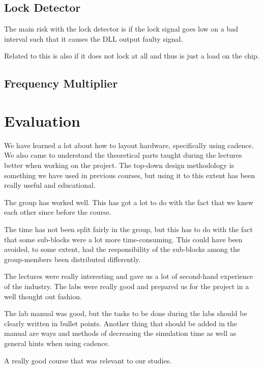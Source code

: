 \documentclass[a4paper,12pt]{article} \usepackage{graphicx}
\begin{document}
\subsection{Lock Detector}
The main risk with the lock detector is if the lock signal goes low on a bad interval such that it causes the DLL output faulty signal.


Related to this is also if it does not lock at all and thus is just a load on the chip. 
\subsection{Frequency Multiplier}

\section{Evaluation}
We have learned a lot about how to layout hardware, specifically using cadence.
We also came to understand the theoretical parts taught during the lectures 
better when working on the project. The top-down design methodology is something 
we have used in previous courses, but using it to this extent has been really 
useful and educational. 

The group has worked well. This has got a lot to do with the
fact that we knew each other since before the course.

The time has not been split fairly in the group, but this has
to do with the fact that some sub-blocks were a lot more time-consuming.
This could have been avoided, to some extent, had the responsibility
of the sub-blocks among the group-members been distributed differently.

The lectures were really interesting and gave us a lot of
second-hand experience of the industry. The labs were really 
good and prepared us for the project in a well thought out fashion.

The lab manual was good, but the tasks to be done during the labs should 
be clearly written in bullet points. Another thing that should be added 
in the manual are ways and methods of decreasing the simulation time as well
as general hints when using cadence.

A really good course that was relevant to our studies.

\newpage
\appendix 
\newpage
\end{document}

